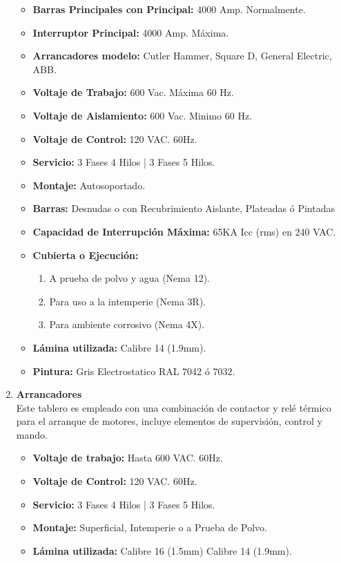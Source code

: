 \documentclass[11pt,letterpaper]{article}
\begin{document}
\begin{enumerate}
		\begin{itemize}
			\item \textbf{Barras Principales con Principal:} 4000 Amp. Normalmente.
			\item \textbf{Interruptor Principal:} 4000 Amp. Máxima.
			\item \textbf{Arrancadores modelo:} Cutler Hammer, Square D, General Electric, ABB.
			\item \textbf{Voltaje de Trabajo:} 600 Vac. Máxima 60 Hz.
			\item \textbf{Voltaje de Aislamiento:} 600 Vac. Minimo 60 Hz.
			\item \textbf{Voltaje de Control:} 120 VAC. 60Hz.
			\item \textbf{Servicio:} 3 Fases 4 Hilos | 3 Fases 5 Hilos.
		 	\item \textbf{Montaje:} Autosoportado.
			\item \textbf{Barras:} Desnudas o con Recubrimiento Aislante, Plateadas ó Pintadas 
			\item \textbf{Capacidad de Interrupción Máxima:} 65KA Icc (rms) en 240 VAC.
			\item \textbf{Cubierta o Ejecución:}
			\begin{enumerate}
				\item A prueba de polvo y agua (Nema 12).
				\item Para uso a la intemperie (Nema 3R).
				\item Para ambiente corrosivo (Nema 4X).
			\end{enumerate}
			\item \textbf{Lámina utilizada:} Calibre 14 (1.9mm).
			\item \textbf{Pintura:} Gris Electrostatico RAL 7042 ó 7032.		
		\end{itemize}
	\item \textbf{Arrancadores}\\
		Este tablero es empleado con una combinación de contactor y relé térmico para el arranque de motores, incluye elementos de supervisión, control y mando.
		\begin{itemize}
			\item \textbf{Voltaje de trabajo:} Hasta 600 VAC. 60Hz.
			\item \textbf{Voltaje de Control:} 120 VAC. 60Hz.
			\item \textbf{Servicio:} 3 Fases 4 Hilos | 3 Fases 5 Hilos.
			\item \textbf{Montaje:} Superficial, Intemperie o a Prueba de Polvo.
			\item \textbf{Lámina utilizada:} Calibre 16 (1.5mm) Calibre 14 (1.9mm).

\end{itemize}
\end{enumerate}
\end{document}

